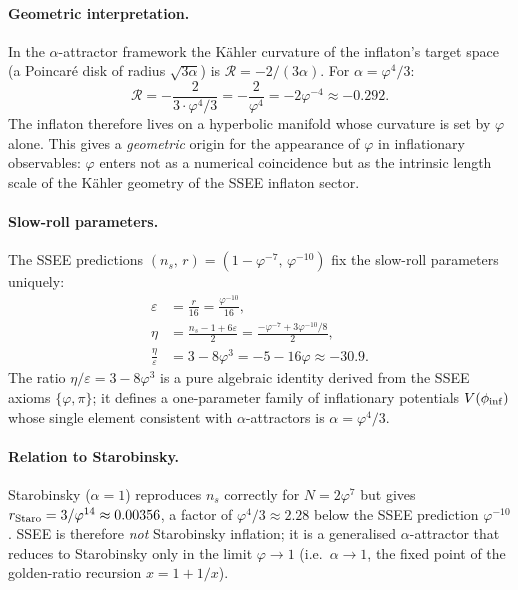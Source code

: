 \paragraph{Geometric interpretation.}
In the $\alpha$-attractor framework the K\"{a}hler curvature of the
inflaton's target space (a Poincar\'{e} disk of radius $\sqrt{3\alpha}$)
is $\mathcal{R} = -2/(3\alpha)$.
For $\alpha = \varphi^{4}/3$:
\begin{equation}
  \mathcal{R} = -\frac{2}{3 \cdot \varphi^{4}/3} = -\frac{2}{\varphi^{4}}
               = -2\varphi^{-4} \approx -0.292.
  \label{eq:kahler_curvature}
\end{equation}
The inflaton therefore lives on a hyperbolic manifold whose curvature is
set by $\varphi$ alone. This gives a \emph{geometric} origin for the
appearance of $\varphi$ in inflationary observables: $\varphi$ enters not
as a numerical coincidence but as the intrinsic length scale of the
K\"{a}hler geometry of the SSEE inflaton sector.

\paragraph{Slow-roll parameters.}
The SSEE predictions $(n_s,\,r) = (1-\varphi^{-7},\,\varphi^{-10})$ fix the
slow-roll parameters uniquely:
\begin{align}
  \varepsilon &= \frac{r}{16} = \frac{\varphi^{-10}}{16}, \label{eq:sr_eps} \\
  \eta &= \frac{n_s - 1 + 6\varepsilon}{2}
        = \frac{-\varphi^{-7} + 3\varphi^{-10}/8}{2}, \label{eq:sr_eta} \\
  \frac{\eta}{\varepsilon} &= 3 - 8\varphi^{3} = -5 - 16\varphi \approx -30.9.
  \label{eq:sr_ratio}
\end{align}
The ratio $\eta/\varepsilon = 3 - 8\varphi^{3}$ is a pure algebraic
identity derived from the SSEE axioms $\{\varphi, \pi\}$; it defines a
one-parameter family of inflationary potentials $V(\phi_{\rm inf})$ whose
single element consistent with $\alpha$-attractors is $\alpha = \varphi^{4}/3$.

\paragraph{Relation to Starobinsky.}
Starobinsky ($\alpha = 1$) reproduces $n_s$ correctly for $N = 2\varphi^{7}$
but gives $r_{\rm Staro} = 3/\varphi^{14} \approx 0.00356$, a factor of
$\varphi^{4}/3\approx 2.28$ below the SSEE prediction $\varphi^{-10}$.
SSEE is therefore \emph{not} Starobinsky inflation; it is a generalised
$\alpha$-attractor that reduces to Starobinsky only in the limit
$\varphi \to 1$ (i.e.\ $\alpha \to 1$, the fixed point of the golden-ratio
recursion $x = 1 + 1/x$).

